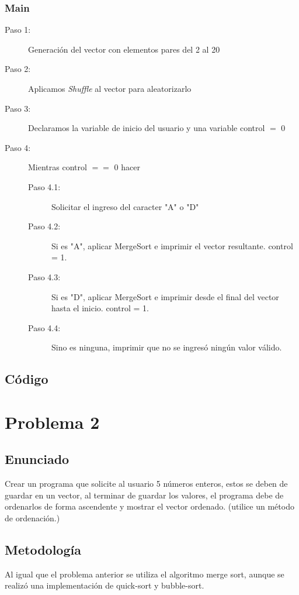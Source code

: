 \subsubsection{Main}
\begin{description}
	\item[Paso 1: ] Generación del vector con elementos pares del 2 al 20
	\item[Paso 2: ] Aplicamos \textit{Shuffle} al vector para aleatorizarlo
	\item[Paso 3: ] Declaramos la variable de inicio del usuario y una variable control $=$ 0
	\item[Paso 4: ] Mientras control $==$ 0 hacer
	\begin{description}
			\item[Paso 4.1: ] Solicitar el ingreso del caracter "A" o "D"
			\item[Paso 4.2: ] Si es "A", aplicar MergeSort e imprimir el vector resultante. control = 1.
			\item[Paso 4.3: ] Si es "D", aplicar MergeSort e imprimir desde el final del vector hasta el inicio. control = 1.
			\item[Paso 4.4: ] Sino es ninguna, imprimir que no se ingresó ningún valor válido.
		\end{description}
\end{description}


\subsection{Código}



\section{Problema 2}
\subsection{Enunciado}
Crear un programa que solicite al usuario 5 números enteros, estos se deben de guardar en un vector,
al terminar de guardar los valores, el programa debe de ordenarlos de forma ascendente y mostrar el
vector ordenado. (utilice un método de ordenación.)

\subsection{Metodología}
Al igual que el problema anterior se utiliza el algoritmo merge sort, aunque se realizó una implementación de quick-sort y bubble-sort.

